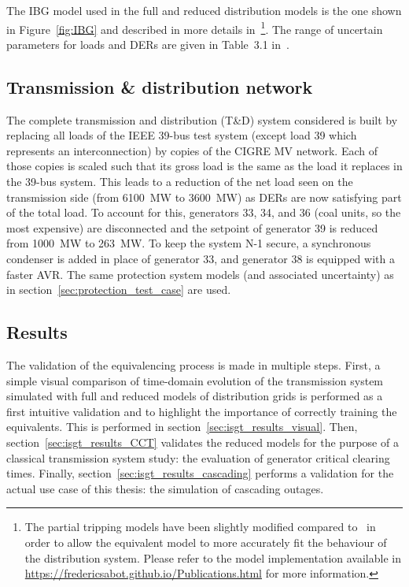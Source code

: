 The IBG model used in the full and reduced distribution models is the one shown in Figure~\ref{fig:IBG} and described in more details in~\cite{ChaspierreThesis}\footnote{The partial tripping models have been slightly modified compared to~\cite{ChaspierreThesis} in order to allow the equivalent model to more accurately fit the behaviour of the distribution system. Please refer to the model implementation available in \url{https://fredericsabot.github.io/Publications.html} for more information.}. The range of uncertain parameters for loads and DERs are given in Table~3.1 in~\cite{ChaspierreThesis}.

\subsection{Transmission \& distribution network}
\label{sec:isgt_TD}

The complete transmission and distribution (T\&D) system considered is built by replacing all loads of the IEEE 39-bus test system (except load 39 which represents an interconnection) by copies of the CIGRE MV network. Each of those copies is scaled such that its gross load is the same as the load it replaces in the 39-bus system. This leads to a reduction of the net load seen on the transmission side (from 6100~MW to 3600~MW) as DERs are now satisfying part of the total load. To account for this, generators 33, 34, and 36 (coal units, so the most expensive) are disconnected and the setpoint of generator 39 is reduced from 1000~MW to 263~MW. To keep the system N-1 secure, a synchronous condenser is added in place of generator 33, and generator 38 is equipped with a faster AVR. The same protection system models (and associated uncertainty) as in section~\ref{sec:protection_test_case} are used.

\subsection{Results}
\label{sec:isgt_results}

The validation of the equivalencing process is made in multiple steps. First, a simple visual comparison of time-domain evolution of the transmission system simulated with full and reduced models of distribution grids is performed as a first intuitive validation and to highlight the importance of correctly training the equivalents. This is performed in section~\ref{sec:isgt_results_visual}. Then, section~\ref{sec:isgt_results_CCT} validates the reduced models for the purpose of a classical transmission system study: the evaluation of generator critical clearing times. Finally, section~\ref{sec:isgt_results_cascading} performs a validation for the actual use case of this thesis: the simulation of cascading outages.


